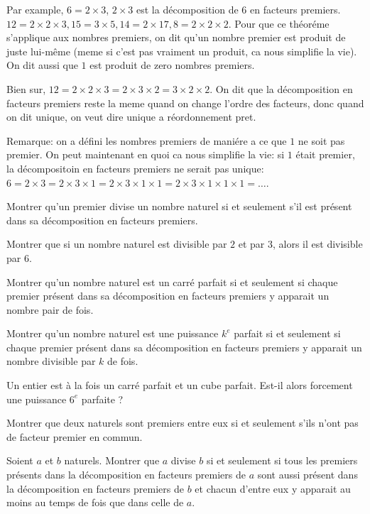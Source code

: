 \endgroup

Par example, \(6 = 2 \times 3\), \(2 \times 3\) est la décomposition de \(6\) en facteurs premiers. \(12 = 2 \times 2 \times 3, 15 = 3 \times 5, 14 = 2 \times 17, 8 = 2 \times 2 \times 2\).
Pour que ce théoréme s'applique aux nombres premiers, on dit qu'un nombre premier est produit de juste lui-même (meme si c'est pas vraiment un produit, ca nous simplifie la vie). On dit aussi que \(1\) est produit de zero nombres premiers.

Bien sur, \(12 = 2 \times 2 \times 3 = 2 \times 3 \times 2 = 3 \times 2 \times 2\). On dit que la décomposition en facteurs premiers reste la meme quand on change l'ordre des facteurs, donc quand on dit unique, on veut dire unique a réordonnement pret.

Remarque: on a défini les nombres premiers de maniére a ce que \(1\) ne soit pas premier. On peut maintenant en quoi ca nous simplifie la vie: si \(1\) était premier, la décompositoin en facteurs premiers ne serait pas unique: \(6 = 2 \times 3 = 2 \times 3 \times 1 = 2 \times 3 \times 1 \times 1 = 2 \times 3 \times 1 \times 1 \times 1 = \ldots\).

\exo
Montrer qu'un premier divise un nombre naturel si et seulement s’il est présent dans sa décomposition en facteurs premiers.

\exo
Montrer que si un nombre naturel est divisible par \(2\) et par \(3\), alors il est divisible par \(6\).

\exo

Montrer qu’un nombre naturel est un carré parfait si et seulement si chaque premier présent dans sa décomposition en facteurs premiers y apparait un nombre pair de fois.

Montrer qu’un nombre naturel est une puissance \(k^{e}\) parfait si et seulement si chaque premier présent dans sa décomposition en facteurs premiers y apparait un nombre divisible par \(k\) de fois.

\exo
Un entier est à la fois un carré parfait et un cube parfait.
Est-il alors forcement une puissance \(6^{e}\) parfaite ?

\exo

Montrer que deux naturels sont premiers entre eux si et seulement s’ils n'ont pas de facteur premier en commun.


\exo
Soient \(a\) et \(b\) naturels.
Montrer que \(a\) divise \(b\) si et seulement si tous les premiers présents dans la décomposition en facteurs premiers de \(a\) sont aussi présent dans la décomposition en facteurs premiers de \(b\) et chacun d'entre eux y apparait au moins au temps de fois que dans celle de \(a\).

